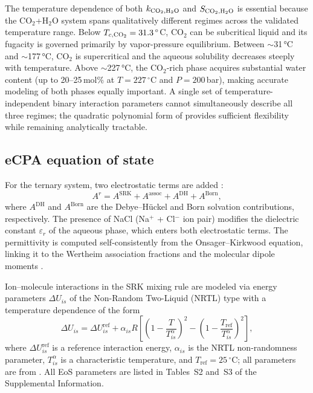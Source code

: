 \documentclass[preprint,12pt,number]{elsarticle}
\begin{document}
The temperature dependence of both $k_{{\rm CO_2},{\rm H_2O}}$ and $S_{{\rm CO_2},{\rm H_2O}}$ is essential because the CO$_2$+H$_2$O
system spans qualitatively different regimes across the validated temperature range.
Below $T_{c,{\rm CO_2}} = 31.3\,^\circ$C, CO$_2$ can be subcritical liquid and its fugacity is
governed primarily by vapor-pressure equilibrium.
Between $\sim$31\,°C and $\sim$177\,°C, CO$_2$ is supercritical and the aqueous solubility
decreases steeply with temperature.
Above $\sim$227\,°C, the CO$_2$-rich phase acquires substantial water content
(up to 20--25\,mol\% at $T = 227\,^\circ$C and $P = 200$\,bar), making accurate modeling of both
phases equally important.
A single set of temperature-independent binary interaction parameters cannot simultaneously
describe all three regimes; the quadratic polynomial form of \citet{Coelho2025} provides
sufficient flexibility while remaining analytically tractable.

\subsection{eCPA equation of state}
\label{sec:ecpa}

For the ternary system, two electrostatic terms are added \citep{MaribMogensen2015}:
\begin{equation}
  A^r = A^{\text{SRK}} + A^{\text{assoc}} + A^{\text{DH}} + A^{\text{Born}},
  \label{eq:Ar_ecpa}
\end{equation}
where $A^{\text{DH}}$ and $A^{\text{Born}}$ are the Debye--Hückel and Born solvation
contributions, respectively.
The presence of NaCl (Na$^+$ + Cl$^-$ ion pair) modifies the dielectric constant $\varepsilon_r$
of the aqueous phase, which enters both electrostatic terms.
The permittivity is computed self-consistently from the Onsager--Kirkwood equation, linking
it to the Wertheim association fractions and the molecular dipole moments \citep{Coelho2025}.

Ion--molecule interactions in the SRK mixing rule are modeled via energy
parameters $\Delta U_{is}$ of the Non-Random Two-Liquid (NRTL) type with a temperature dependence of the form
\begin{equation}
  \Delta U_{is} = \Delta U_{is}^{\text{ref}} + \alpha_{is}R\!\left[
    \left(1 - \frac{T}{T_{is}^\alpha}\right)^2 - \left(1-\frac{T_{\text{ref}}}{T_{is}^\alpha}\right)^2
  \right],
  \label{eq:DeltaU}
\end{equation}
where $\Delta U_{is}^{\text{ref}}$ is a reference interaction energy, $\alpha_{is}$ is the
NRTL non-randomness parameter, $T_{is}^\alpha$ is a characteristic temperature, and
$T_{\text{ref}} = 25\,^\circ$C; all parameters are from \citet{Coelho2025}.
All EoS parameters are listed in Tables~S2 and~S3 of the Supplemental Information.
\end{document}

